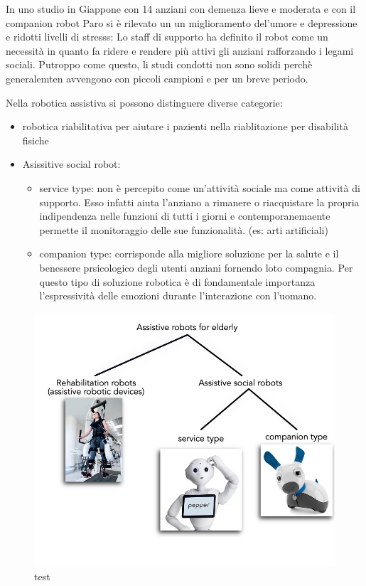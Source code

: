\documentclass{thesisreport}
\begin{document}
 In uno studio in Giappone con 14 anziani con demenza lieve e moderata e con il companion robot Paro si è rilevato un un miglioramento del'umore e depressione e ridotti livelli di stresss:
 Lo staff di supporto ha definito il robot come un necessità in quanto fa ridere e rendere più attivi gli anziani rafforzando i legami sociali. 
 Putroppo come questo, li studi condotti non sono solidi perchè generalemten avvengono con piccoli campioni e per un breve periodo. 
 
 Nella robotica assistiva si possono distinguere diverse categorie:
 \begin{itemize}
     \item robotica riabilitativa per aiutare i pazienti nella riablitazione per disabilità fisiche
     \item  Asissitive social robot:
     \begin{itemize}
         \item service type: non è percepito come un'attività sociale ma come attività di supporto. Esso infatti aiuta l'anziano a rimanere o riacquistare la propria indipendenza nelle funzioni di tutti i giorni e contemporanemaente permette il monitoraggio delle sue funzionalità. (es: arti artificiali)
         \item companion type: corrisponde alla migliore soluzione per la salute e il benessere prsicologico degli utenti anziani fornendo loto compagnia. Per questo tipo di soluzione robotica è di fondamentale importanza l'espressività delle emozioni durante l'interazione con l'uomano.
     \end{itemize}
 \end{itemize}
 \begin{figure}[h]
	\centering
	\includegraphics[width=13cm]{Thesis/data/TypeRobot.jpg}
	\caption{test}
	\label{fig:layers}
 \end{figure}
 
\end{document}
